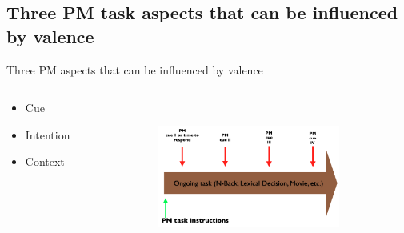 \documentclass[xcolor=x11names,compress]{beamer}
\renewcommand{\(}{\begin{columns}}
\renewcommand{\)}{\end{columns}}
\newcommand{\<}[1]{\begin{column}{#1}}
\renewcommand{\>}{\end{column}}
\begin{document}



\subsection{Three PM task aspects that can be influenced by valence}
\begin{frame}{Three PM aspects that can be influenced by valence}
  \begin{columns}[T]
    \begin{column}{.5\textwidth}
     \begin{block}{}
     \begin{itemize}
     	\item Cue
     	\item Intention
     	\item Context
     \end{itemize}
    \end{block}
    \end{column}
    \begin{column}{.5\textwidth}
    \begin{block}{}
   \includegraphics[width=6cm, height=5cm]{LAB.png} 
    \end{block}
    \end{column}
  \end{columns}
\end{frame}
 
\end{document}
